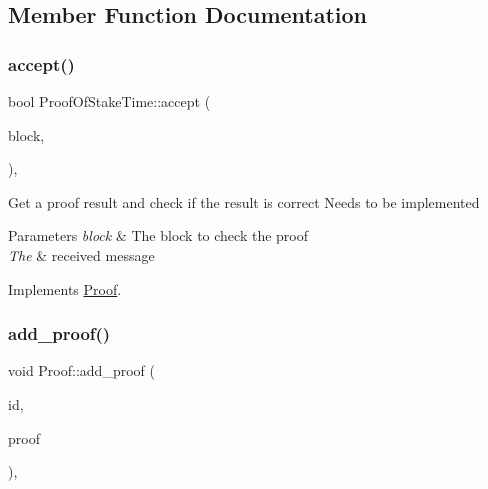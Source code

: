 \subsection{Member Function Documentation}
\mbox{\label{classProofOfStakeTime_a7a681ba9510b3b11cd2269a69e64a66c}} 
\subsubsection{\texorpdfstring{accept()}{accept()}}
{\footnotesize\ttfamily bool Proof\+Of\+Stake\+Time\+::accept (\begin{DoxyParamCaption}\item[{\mbox{\hyperlink{classBlock}{Block}} $\ast$}]{block,  }\item[{\mbox{\hyperlink{classMessage}{Message}} $\ast$}]{ }\end{DoxyParamCaption})\hspace{0.3cm}{\ttfamily [override]}, {\ttfamily [virtual]}}

Get a proof result and check if the result is correct Needs to be implemented


\begin{DoxyParams}{Parameters}
{\em block} & The block to check the proof \\
\hline
{\em The} & received message \\
\hline
\end{DoxyParams}


Implements \mbox{\hyperlink{classProof_ad52fee058ea617a186133cb6a008fe6e}{Proof}}.

\mbox{\label{classProof_a71874539fdbcc93c15594b889c95225b}} 
\subsubsection{\texorpdfstring{add\+\_\+proof()}{add\_proof()}}
{\footnotesize\ttfamily void Proof\+::add\+\_\+proof (\begin{DoxyParamCaption}\item[{int}]{id,  }\item[{std\+::function$<$ \mbox{\hyperlink{classProof}{Proof}} $\ast$()$>$}]{proof }\end{DoxyParamCaption})\hspace{0.3cm}{\ttfamily [static]}, {\ttfamily [inherited]}}

